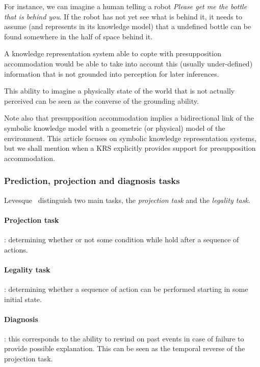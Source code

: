 \documentclass[a4paper, twocolumn]{article}
\begin{document}
For instance, we can imagine a human telling a robot \emph{Please get me the
bottle that is behind you}. If the robot has not yet see what is behind it, it
needs to assume (and represents in its knowledge model) that a undefined bottle
can be found somewhere in the half of space behind it.

A knowledge representation system able to copte with presupposition
accommodation would be able to take into account this (usually under-defined)
information that is not grounded into perception for later inferences.

This ability to imagine a physically state of the world that is not actually
perceived can be seen as the converse of the grounding ability.

Note also that presupposition accommodation implies a bidirectional link of the
symbolic knowledge model with a geometric (or physical) model of the
environment. This article focuses on symbolic knowledge representation systems,
but we shall mention when a KRS explicitly provides support for presupposition
accommodation.

\subsubsection{Prediction, projection and diagnosis tasks}
\label{sect|prediction-projection}

Levesque~\cite{Levesque2008} distinguish two main tasks, the \emph{projection
task} and the \emph{legality task}.

\paragraph{Projection task}: determining whether or not some condition while
hold after a sequence of actions.

\paragraph{Legality task}: determining whether a sequence of action can be
performed starting in some initial state.

\paragraph{Diagnosis}: this corresponds to the ability to rewind on past events
in case of failure to provide possible explanation. This can be seen as the
temporal reverse of the projection task.
\end{document}
